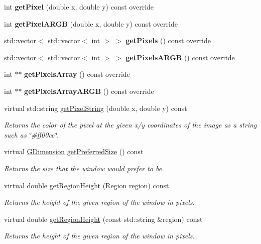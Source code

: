 \begin{DoxyCompactItemize}
int {\bfseries get\+Pixel} (double x, double y) const override
\item 
int {\bfseries get\+Pixel\+A\+R\+GB} (double x, double y) const override
\item 
std\+::vector$<$ std\+::vector$<$ int $>$ $>$ {\bfseries get\+Pixels} () const override
\item 
std\+::vector$<$ std\+::vector$<$ int $>$ $>$ {\bfseries get\+Pixels\+A\+R\+GB} () const override
\item 
int $\ast$$\ast$ {\bfseries get\+Pixels\+Array} () const override
\item 
int $\ast$$\ast$ {\bfseries get\+Pixels\+Array\+A\+R\+GB} () const override
\item 
virtual std\+::string \mbox{\hyperlink{classsgl_1_1GDrawingSurface_a8da04ef488ec5fa498fbbffaf50928fd}{get\+Pixel\+String}} (double x, double y) const
\begin{DoxyCompactList}\small\item\em Returns the color of the pixel at the given x/y coordinates of the image as a string such as \char`\"{}\#ff00cc\char`\"{}. \end{DoxyCompactList}\item 
virtual \mbox{\hyperlink{structsgl_1_1GDimension}{G\+Dimension}} \mbox{\hyperlink{classsgl_1_1GWindow_a4aabbee761d8e9116275401131b7ccd1}{get\+Preferred\+Size}} () const
\begin{DoxyCompactList}\small\item\em Returns the size that the window would prefer to be. \end{DoxyCompactList}\item 
virtual double \mbox{\hyperlink{classsgl_1_1GWindow_a164d248057318961e7f2abc8c3477d63}{get\+Region\+Height}} (\mbox{\hyperlink{classsgl_1_1GWindow_a81a01a86de31071a92e6cce0bab9bc4b}{Region}} region) const
\begin{DoxyCompactList}\small\item\em Returns the height of the given region of the window in pixels. \end{DoxyCompactList}\item 
virtual double \mbox{\hyperlink{classsgl_1_1GWindow_ae8a545e772745b89edaf9804a2dc0057}{get\+Region\+Height}} (const std\+::string \&region) const
\begin{DoxyCompactList}\small\item\em Returns the height of the given region of the window in pixels. \end{DoxyCompactList}\item 

\end{DoxyCompactItemize}
